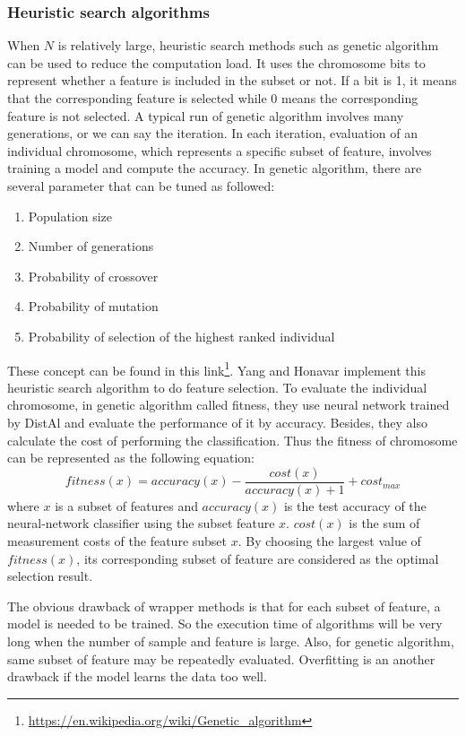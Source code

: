 \subsubsection{Heuristic search algorithms}
When $N$ is relatively large, heuristic search methods such as genetic algorithm\cite{golberg1989genetic} can be used to reduce the computation load. It uses the chromosome bits to represent whether a feature is included in the subset or not. If a bit is 1, it means that the corresponding feature is selected while 0 means the corresponding feature is not selected. A typical run of genetic algorithm involves many generations, or we can say the iteration. In each iteration, evaluation of an individual chromosome, which represents a specific subset of feature, involves training a model and compute the accuracy. In genetic algorithm, there are several parameter that can be tuned as followed:
\begin{enumerate} \item Population size \item Number of generations \item Probability of crossover \item Probability of mutation \item Probability of selection of the highest ranked individual
\end{enumerate}
These concept can be found in this link\footnote{\url{https://en.wikipedia.org/wiki/Genetic_algorithm}}.
Yang and Honavar implement this heuristic search algorithm to do feature selection\cite{yang1998feature}. To evaluate the individual chromosome, in genetic algorithm called fitness, they use neural network trained by DistAl\cite{yang1998distal} and evaluate the performance of it by accuracy. Besides, they also calculate the cost of performing the classification. Thus the fitness of chromosome can be represented as the following equation:
\begin{equation} \label{Eq.fitness}
fitness(x)=accuracy(x)-\frac{cost(x)}{accuracy(x)+1}+cost_{max}
\end{equation}
where $x$ is a subset of features and $accuracy(x)$ is the test accuracy of the neural-network classifier using the subset feature $x$. $cost(x)$ is the sum of measurement costs of the feature subset $x$. By choosing the largest value of $fitness(x)$, its corresponding subset of feature are considered as the optimal selection result.

The obvious drawback of wrapper methods is that for each subset of feature, a model is needed to be trained. So the execution time of algorithms will be very long when the number of sample and feature is large. Also, for genetic algorithm, same subset of feature may be repeatedly evaluated. Overfitting is an another drawback if the model learns the data too well.

